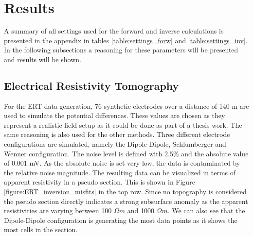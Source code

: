 \section{Results}\label{section:Results}

A summary of all settings used for the forward and inverse calculations is presented in the appendix in tables \ref{table:settings_forw} and \ref{table:settings_inv}. In the following subsections a reasoning for these parameters will be presented and results will be shown. 

\subsection{Electrical Resistivity Tomography}
For the ERT data generation, 76 synthetic electrodes over a distance of 140 m are used to simulate the potential differences. These values are chosen as they represent a realistic field setup as it could be done as part of a thesis work. The same reasoning is also used for the other methods. Three different electrode configurations are simulated, namely the Dipole-Dipole, Schlumberger and Wenner configuration. The noise level is defined with 2.5\% and the absolute value of 0.001 mV. As the absolute noise is set very low, the data is contaminated by the relative noise magnitude. The resulting data can be visualized in terms of apparent resistivity in a pseudo section. This is shown in Figure \ref{figure:ERT_inversion_misfits} in the top row. Since no topography is considered the pseudo section directly indicates a strong subsurface anomaly as the apparent resistivities are varying between 100 $\Omega m$ and 1000 $\Omega m$. We can also see that the Dipole-Dipole configuration is generating the most data points as it shows the most cells in the section. 

